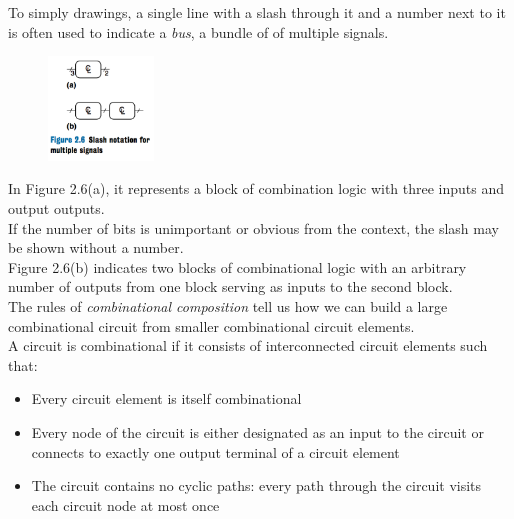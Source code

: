 \documentclass[12pt]{article}
\theoremstyle{definition}
\begin{document}
  To simply drawings, a single line with a slash through it and a number next to it is often used to indicate a \emph{bus}, a bundle of of multiple signals.
\\
  \begin{figure}
    \centering
    \includegraphics[width=0.25\textwidth]{pictures/busExample.png}
  \end{figure}
  In Figure 2.6(a), it represents a block of combination logic with three inputs and output outputs. \\
  If the number of bits is unimportant or obvious from the context, the slash may be shown without a number. \\
  Figure 2.6(b) indicates two blocks of combinational logic with an arbitrary number of outputs from one block serving as inputs to the second block. \\

  The rules of \emph{combinational composition} tell us how we can build a large combinational circuit from smaller combinational circuit elements. \\
  A circuit is combinational if it consists of interconnected circuit elements such that:
  \begin{itemize}
    \item Every circuit element is itself combinational
    \item Every node of the circuit is either designated as an input to the circuit or connects to exactly one output terminal of a circuit element
    \item The circuit contains no cyclic paths: every path through the circuit visits each circuit node at most once
  \end{itemize}
\end{document}

